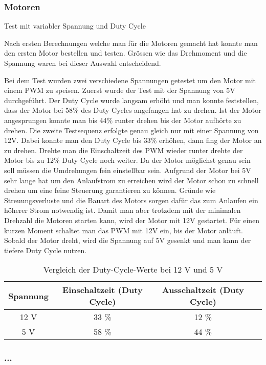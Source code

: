 \subsubsection{Motoren}

Test mit variabler Spannung und Duty Cycle

Nach ersten Berechnungen welche man für die Motoren gemacht hat konnte man den ersten Motor bestellen und testen. Grössen wie das Drehmoment und die Spannung waren bei dieser Auswahl entscheidend.

Bei dem Test wurden zwei verschiedene Spannungen getestet um den Motor mit einem PWM zu speisen. Zuerst wurde der Test mit der Spannung von 5V durchgeführt. Der Duty Cycle wurde langsam erhöht und man konnte feststellen, dass der Motor bei 58\% des Duty Cycles angefangen hat zu drehen. Ist der Motor angesprungen konnte man bis 44\% runter drehen bis der Motor aufhörte zu drehen. Die zweite Testsequenz erfolgte genau gleich nur mit einer Spannung von 12V. Dabei konnte man den Duty Cycle bis 33\% erhöhen, dann fing der Motor an zu drehen. Drehte man die Einschaltzeit des PWM wieder runter drehte der Motor bis zu 12\% Duty Cycle noch weiter. Da der Motor möglichst genau sein soll müssen die Umdrehungen fein einstellbar sein. Aufgrund der Motor bei 5V sehr lange hat um den Anlaufstrom zu erreichen wird der Motor schon zu schnell drehen um eine feine Steuerung garantieren zu können. Gründe wie Streuungsverluste und die Bauart des Motors sorgen dafür das zum Anlaufen ein höherer Strom notwendig ist. Damit man aber trotzdem mit der minimalen Drehzahl die Motoren starten kann, wird der Motor mit 12V gestartet. Für einen kurzen Moment schaltet man das PWM mit 12V ein, bis der Motor anläuft. Sobald der Motor dreht, wird die Spannung auf 5V gesenkt und man kann der tiefere Duty Cycle nutzen.

\begin{table}[h!]
\centering
\begin{tabular}{|c|c|c|c|}
\hline
\textbf{Spannung} & \textbf{Einschaltzeit (Duty Cycle)} & \textbf{Ausschaltzeit (Duty Cycle)} \\ \hline
12 V & 33 \% & 12 \% \\ \hline
5 V  & 58 \% & 44 \% \\ \hline
\end{tabular}
\caption{Vergleich der Duty-Cycle-Werte bei 12 V und 5 V}
\label{tab:dutycycle}
\end{table}

\subsubsection{...}